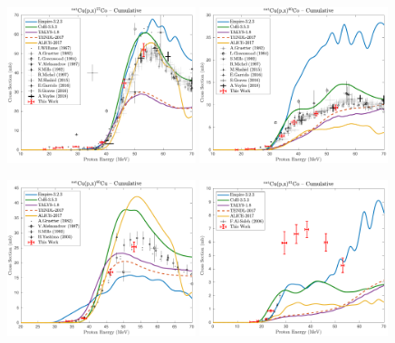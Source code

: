 \begin{figure}
 \centering
 \includegraphics[width=0.49\textwidth]{./figures/57Co_cum.pdf}
 \includegraphics[width=0.49\textwidth]{./figures/60Co.pdf}
 
 \includegraphics[width=0.49\textwidth]{./figures/60Cu.pdf}
 \includegraphics[width=0.49\textwidth]{./figures/61Co.pdf}
 

\end{figure}
